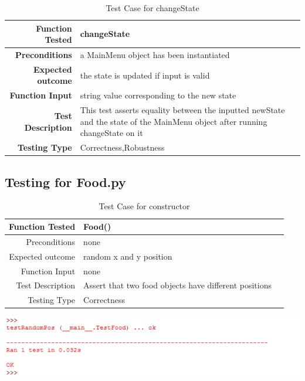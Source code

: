 \documentclass[12pt]{article}
\begin{document}
\begin{center}
	\begin{longtable}{ | r | p{4cm} | p{10cm} }
	\caption{Test Case for changeState} \\ \hline \label{TblInputVar} 
	\textbf{Function Tested} & changeState\\ \hline
	\textbf{Preconditions} & a MainMenu object has been instantiated \\ \hline
	\textbf{Expected outcome} & the state is updated if input is valid \\ \hline
	\textbf{Function Input} & string value corresponding to the new state \\ \hline
	\textbf{Test Description} & This test asserts equality between the inputted newState and the state of the MainMenu object after running changeState on it\\ \hline
	\textbf{Testing Type} & Correctness,Robustness\\ \hline
	
	\end{longtable}
\end{center}


\subsection{Testing for Food.py}
\begin{center}
	\begin{longtable}{ | r | p{4cm} | p{4cm} }
	\caption{Test Case for constructor} \\ \hline \label{TblInputVar} 
	Function Tested & Food()\\ \hline
	Preconditions & none \\ \hline
	Expected outcome & random x and y position \\ \hline
	Function Input & none \\ \hline
	Test Description & Assert that two food objects have different positions \\ \hline
	Testing Type & Correctness\\ \hline
	
	\end{longtable}
\includegraphics{testFoodResults}\newline\newline	
\end{center}
\end{document}
